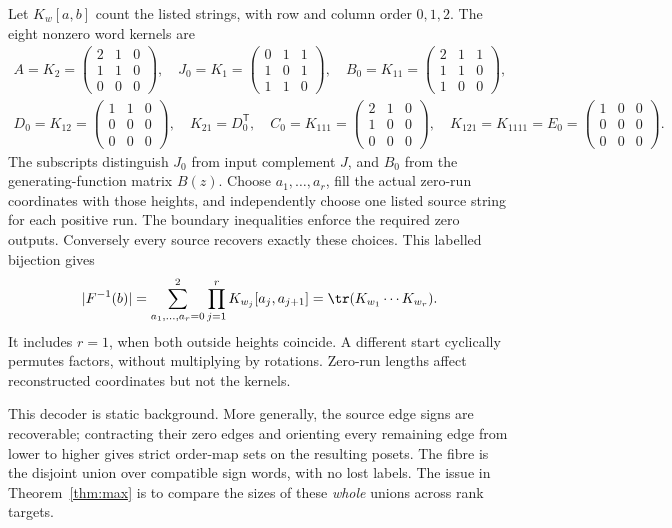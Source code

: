 Let $K_w[a,b]$ count the listed strings, with row and column order
$0,1,2$. The eight nonzero word kernels are
\begin{gather*}
 A=K_2=\begin{pmatrix}2&1&0\\1&1&0\\0&0&0\end{pmatrix},\quad
 J_0=K_1=\begin{pmatrix}0&1&1\\1&0&1\\1&1&0\end{pmatrix},\quad
 B_0=K_{11}=\begin{pmatrix}2&1&1\\1&1&0\\1&0&0\end{pmatrix},\\
 D_0=K_{12}=\begin{pmatrix}1&1&0\\0&0&0\\0&0&0\end{pmatrix},\quad
 K_{21}=D_0^{\mathsf T},\quad
 C_0=K_{111}=\begin{pmatrix}2&1&0\\1&0&0\\0&0&0\end{pmatrix},\quad
 K_{121}=K_{1111}=E_0=\begin{pmatrix}1&0&0\\0&0&0\\0&0&0\end{pmatrix}.
\end{gather*}
The subscripts distinguish $J_0$ from input complement $J$, and $B_0$
from the generating-function matrix $B(z)$. Choose $a_1,\ldots,a_r$,
fill the actual zero-run coordinates with those heights, and independently
choose one listed source string for each positive run. The boundary
inequalities enforce the required zero outputs. Conversely every source
recovers exactly these choices. This labelled bijection gives
\begin{equation}\label{eq:fibretrace}
 |F^{-1}(b)|=\sum_{a_1,\ldots,a_r=0}^2
 \prod_{j=1}^r K_{w_j}[a_j,a_{j+1}]
 =\tr(K_{w_1}\cdots K_{w_r}).
\end{equation}
It includes $r=1$, when both outside heights coincide. A different
start cyclically permutes factors, without multiplying by rotations.
Zero-run lengths affect reconstructed coordinates but not the kernels.

This decoder is static background. More generally, the source edge signs
are recoverable; contracting their zero edges and orienting every
remaining edge from lower to higher gives strict order-map sets on the
resulting posets. The fibre is the disjoint union over compatible sign
words, with no lost labels. The issue in Theorem~\ref{thm:max} is to
compare the sizes of these \emph{whole} unions across rank targets.

